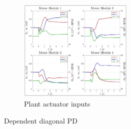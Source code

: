 \begin{figure}[htbp]
\begin{subfigure}{0.49\textwidth}
\label{fig:PD_Diagonal_Dependent_Angular}
\end{subfigure}
\begin{subfigure}{\textwidth}
\centering
\includegraphics[width=0.6\textwidth]{graphs/PD_Diagonal_Dependent_Input}
\vspace{-8pt}
\caption{Plant actuator inputs}
\label{fig:PD_Diagonal_Dependent_Input}
\end{subfigure}
\vspace{-8pt}
\caption{Dependent diagonal PD}
\vspace{-26pt}
\end{figure}
